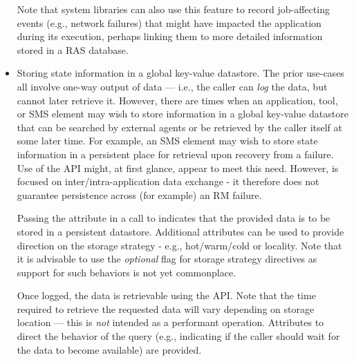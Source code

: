 \begin{itemize}
Note that system libraries can also use this feature to record job-affecting events (e.g., network failures) that might have impacted the application during its execution, perhaps linking them to more detailed information stored in a \ac{RAS} database.

\item Storing state information in a global key-value datastore. The prior use-cases all involve one-way output of data --- i.e., the caller can \emph{log} the data, but cannot later retrieve it. However, there are times when an application, tool, or \ac{SMS} element may wish to store information in a global key-value datastore that can be searched by external agents or be retrieved by the caller itself at some later time. For example, an \ac{SMS} element may wish to store state information in a persistent place for retrieval upon recovery from a failure. Use of the  \ac{API} might, at first glance, appear to meet this need. However,  is focused on inter/intra-application data exchange - it therefore does not guarantee persistence across (for example) an \ac{RM} failure.

Passing the  attribute in a call to  indicates that the provided data is to be stored in a persistent datastore. Additional attributes can be used to provide direction on the storage strategy - e.g., hot/warm/cold or locality. Note that it is advisable to use the \emph{optional} flag for storage strategy directives as support for such behaviors is not yet commonplace.

Once logged, the data is retrievable using the  \ac{API}. Note that the time required to retrieve the requested data will vary depending on storage location --- this is \emph{not} intended as a performant operation. Attributes to direct the behavior of the query (e.g., indicating if the caller should wait for the data to become available) are provided.
\end{itemize}

